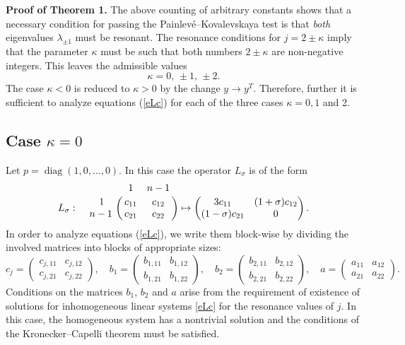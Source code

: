 \documentclass{article}
\theoremstyle{plain}
\theoremstyle{definition}
\DeclareMathOperator{\diag}{diag}
\begin{document}
{\bf Proof of Theorem 1.} The above counting of arbitrary constants shows that a necessary condition for passing the Painlev\'e--Kovalevskaya test is that {\em both} eigenvalues $\lambda_{\pm 1}$ must be resonant. The resonance conditions for $j=2\pm\kappa$ imply that the parameter $\kappa$ must be such that both numbers $2\pm\kappa$ are non-negative integers. This leaves the admissible values
\[
 \kappa=0,\,\pm 1,\,\pm 2.
\] 
The case $\kappa<0$ is reduced to $\kappa>0$ by the change $y\to y^T$. Therefore, further it is sufficient to analyze equations (\ref{eLc}) for each of the three cases $\kappa=0,1$ and 2. 

\subsection{Case $\kappa = 0$}\label{kap0}

Let $p=\diag(1,0,\dots,0)$. In this case the operator $L_\sigma$ is of the form 
\[
 L_\sigma:\quad 
 \bordermatrix{ & 1 & n-1 \cr
  ~~~1 & c_{11} & c_{12}\cr 
  n-1  & c_{21} & c_{22}} 
 \mapsto
 \begin{pmatrix}
  3c_{11} &  (1+\sigma)c_{12}\\ 
  (1-\sigma)c_{21} & 0 
 \end{pmatrix}.
\]
In order to analyze equations (\ref{eLc}), we write them block-wise by dividing the involved matrices into blocks of appropriate sizes:
\[
 c_j=\begin{pmatrix}
   c_{j,11} & c_{j,12} \\
   c_{j,21} & c_{j,22}
 \end{pmatrix},\quad
 b_1=\begin{pmatrix}
   b_{1,11} & b_{1,12} \\
   b_{1,21} & b_{1,22}
 \end{pmatrix},\quad
 b_2=\begin{pmatrix}
   b_{2,11} & b_{2,12} \\
   b_{2,21} & b_{2,22}
 \end{pmatrix},\quad
 a=\begin{pmatrix}
   a_{11} & a_{12} \\
   a_{21} & a_{22}
 \end{pmatrix}.
\]
Conditions on the matrices $b_1$, $b_2$ and $a$ arise from the requirement of existence of solutions for inhomogeneous linear systems \eqref{eLc} for the resonance values of $j$. In this case, the homogeneous system has a nontrivial solution and the conditions of the Kronecker--Capelli theorem must be satisfied.
\end{document}
